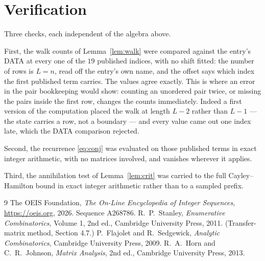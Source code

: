 \documentclass[11pt,a4paper]{article}
\theoremstyle{plain}
\theoremstyle{definition}
\begin{document}
\section{Verification}

Three checks, each independent of the algebra above.

First, the walk counts of Lemma~\ref{lem:walk} were compared against the entry's DATA at
every one of the $19$ published indices, with no shift fitted: the number of rows is
$L=n$, read off the entry's own name, and the offset says which index the first
published term carries. The values agree exactly. This is where an error in the pair
bookkeeping would show: counting an unordered pair twice, or missing the pairs inside the
first row, changes the counts immediately. Indeed a first version of the computation
placed the walk at length $L-2$ rather than $L-1$ --- the state carries a row, not a
boundary --- and every value came out one index late, which the DATA comparison rejected.

Second, the recurrence \eqref{eq:conj} was evaluated on those published terms in exact
integer arithmetic, with no matrices involved, and vanishes wherever it applies.

Third, the annihilation test of Lemma~\ref{lem:crit} was carried to the full
Cayley--Hamilton bound in exact integer arithmetic rather than to a sampled prefix.

\begin{thebibliography}{9}
 The OEIS Foundation, \emph{The On-Line Encyclopedia of Integer
Sequences}, \url{https://oeis.org}, 2026. Sequence A268786.
 R.~P.~Stanley, \emph{Enumerative Combinatorics}, Volume 1, 2nd ed.,
Cambridge University Press, 2011. (Transfer-matrix method, Section 4.7.)
 P.~Flajolet and R.~Sedgewick, \emph{Analytic Combinatorics}, Cambridge
University Press, 2009.
 R.~A.~Horn and C.~R.~Johnson, \emph{Matrix Analysis}, 2nd ed., Cambridge
University Press, 2013.
\end{thebibliography}
\end{document}
